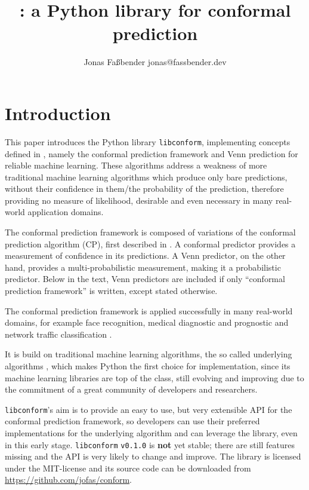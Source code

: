 \documentclass[twoside,11pt]{article}
\title{\libconform{} \version: a Python library for
       conformal prediction}
\author{\name Jonas Fa{\ss}bender
        \email jonas@fassbender.dev}
\def\version{\texttt{v0.1.0}}
\def\libconform{\texttt{libconform}}
\begin{document}
\maketitle




\section{Introduction}

This paper introduces the Python library \libconform,
implementing concepts defined in \citet{alrw}, namely the
conformal prediction framework and Venn prediction for
reliable machine learning.
These algorithms address a weakness of more traditional
machine learning algorithms which produce only bare
predictions, without their confidence in them/the
probability of the prediction, therefore providing no
measure of likelihood, desirable and even necessary in many
real-world application domains.

The conformal prediction framework is composed of
variations of the conformal prediction algorithm (CP),
first described in
\citet{vovk_et_al_1999, saunders_et_al_1999}.
A conformal predictor provides a measurement of confidence
in its predictions.
A Venn predictor, on the other hand, provides a
multi-probabilistic measurement, making it a probabilistic
predictor.
Below in the text, Venn predictors are included if only
``conformal prediction framework'' is written, except
stated otherwise.

The conformal prediction framework is applied successfully
in many real-world domains, for example face recognition,
medical diagnostic and prognostic and network traffic
classification \citep[see][part 3]{cprml}.

It is build on traditional machine learning algorithms, the
so called underlying algorithms
\citep[see][]{papadopoulos_et_al_2007}, which makes Python
the first choice for implementation, since its machine
learning libraries are top of the class, still evolving and
improving due to the commitment of a great community of
developers and researchers.

\libconform's aim is to provide an easy to use, but very
extensible API for the conformal prediction framework, so
developers can use their preferred implementations for the
underlying algorithm and can leverage the library, even in
this early stage.
\libconform{} \version{} is \textbf{not} yet stable; there
are still features missing and the API is very likely to
change and improve.
The library is licensed under the MIT-license and its
source code can be downloaded from
\url{https://github.com/jofas/conform}.
\end{document}
